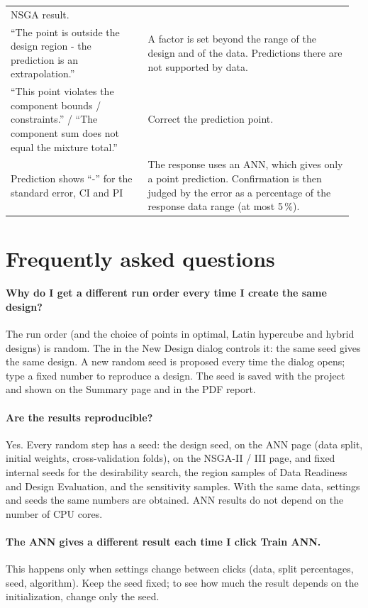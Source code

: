 {\begin{longtable}{@{}p{0.38\linewidth}p{0.58\linewidth}@{}}
NSGA result. \\
\addlinespace
``The point is outside the design region - the prediction is an extrapolation.'' &
A factor is set beyond the range of the design and of the data. Predictions there are not supported by data. \\
\addlinespace
``This point violates the component bounds / constraints.'' / ``The component sum does not equal the mixture
total.'' & Correct the prediction point. \\
\addlinespace
Prediction shows ``-'' for the standard error, CI and PI &
The response uses an ANN, which gives only a point prediction. Confirmation is then judged by the error as a
percentage of the response data range (at most 5\,\%). \\
\end{longtable}}

\section{Frequently asked questions}
\label{sec:ch12-faq}

\paragraph{Why do I get a different run order every time I create the same design?}
The run order (and the choice of points in optimal, Latin hypercube and hybrid designs) is random. The
 in the New Design dialog controls it: the same seed gives the same design. A new random seed is
proposed every time the dialog opens; type a fixed number to reproduce a design. The seed is saved with the project
and shown on the Summary page and in the PDF report.

\paragraph{Are the results reproducible?}
Yes. Every random step has a seed: the design seed,  on the ANN page (data split, initial weights,
cross-validation folds),  on the NSGA-II / III page, and fixed internal seeds for the desirability
search, the region samples of Data Readiness and Design Evaluation, and the sensitivity samples. With the same data,
settings and seeds the same numbers are obtained. ANN results do not depend on the number of CPU cores.

\paragraph{The ANN gives a different result each time I click Train ANN.}
This happens only when settings change between clicks (data, split percentages, seed, algorithm). Keep the seed
fixed; to see how much the result depends on the initialization, change only the seed.

